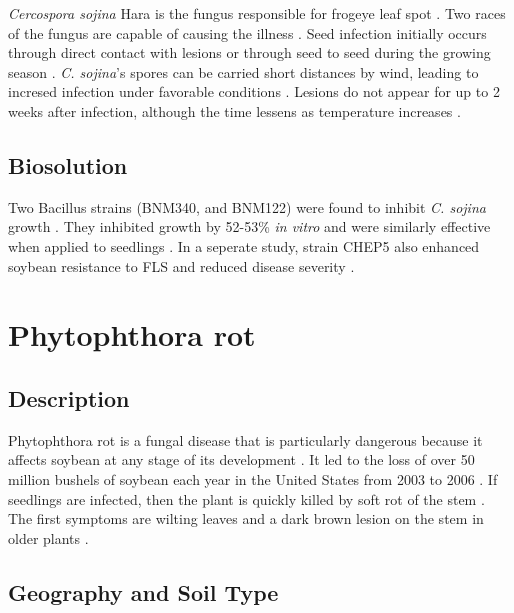 \documentclass[letterpaper, 12pt]{report}
\begin{document}
\emph{Cercospora sojina} Hara is the fungus responsible for frogeye leaf spot \autocite{mian2008frogeye}. Two races of the fungus are capable of causing the illness \autocite{dunleavy1966soybean}. Seed infection initially occurs through direct contact with lesions or through seed to seed during the growing season \autocite{mian2008frogeye}. \emph{C. sojina}'s spores can be carried short distances by wind, leading to incresed infection under favorable conditions \autocite{mian2008frogeye}. Lesions do not appear for up to 2 weeks after infection, although the time lessens as temperature increases \autocite{mian2008frogeye}.

\subsection{Biosolution}

Two Bacillus strains (BNM340, and BNM122) were found to inhibit \emph{C. sojina} growth \autocite{simonetti2012evaluation}. They inhibited growth by 52-53\% \emph{in vitro} and were similarly effective when applied to seedlings \autocite{simonetti2012evaluation}. In a seperate study, strain CHEP5 also enhanced soybean resistance to FLS and reduced disease severity \autocite{tonelli2014biocontrol}.


\section{Phytophthora rot}

\subsection{Description}

Phytophthora rot is a fungal disease that is particularly dangerous because it affects soybean at any stage of its development \autocite{schmitthenner2000phytophthora}. It led to the loss of over 50 million bushels of soybean each year in the United States from 2003 to 2006 \autocite{wrather2009effects}. If seedlings are infected, then the plant is quickly killed by soft rot of the stem \autocite{dunleavy1966soybean}. The first symptoms are wilting leaves and a dark brown lesion on the stem in older plants \autocite{schmitthenner2000phytophthora}.

\subsection{Geography and Soil Type}
\end{document}
